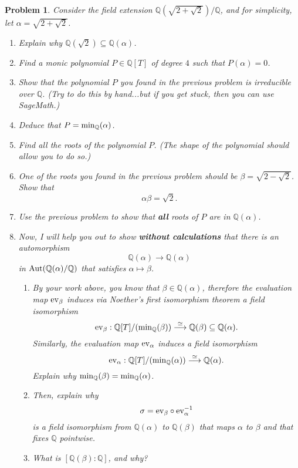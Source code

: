 \documentclass[reqno]{amsart}
\theoremstyle{plain}
\newtheorem{problem}{Problem}
\theoremstyle{definition}
\begin{document}
\begin{problem}
Consider the field extension $\mathbb{Q}(\sqrt{2 + \sqrt{2}})/\mathbb{Q}$, and for simplicity, let $\alpha = \sqrt{2 + \sqrt{2}}$.
\begin{enumerate}
\item Explain why $\mathbb{Q}(\sqrt{2}) \subseteq \mathbb{Q}(\alpha)$.
\item Find a monic polynomial $P \in \mathbb{Q}[T]$ of degree $4$ such that $P(\alpha) = 0$.
\item Show that the polynomial $P$ you found in the previous problem is irreducible over $\mathbb{Q}$.  (Try to do this by hand...but if you get stuck, then you can use SageMath.)
\item Deduce that $P = {\rm min}_{\mathbb{Q}}(\alpha)$.
\item Find all the roots of the polynomial $P$.  (The shape of the polynomial should allow you to do so.)
\item One of the roots you found in the previous problem should be $\beta = \sqrt{2 - \sqrt{2}}$.  Show that
$$\alpha \beta = \sqrt{2}. $$
\item Use the previous problem to show that {\bfseries all} roots of $P$ are in $\mathbb{Q}(\alpha)$.
\item Now, I will help you out to show {\bfseries without calculations} that there is an automorphism 
$$\mathbb{Q}(\alpha) \rightarrow \mathbb{Q}(\alpha)$$
in ${\rm Aut}(\mathbb{Q}(\alpha)/\mathbb{Q})$ that satisfies $\alpha \mapsto \beta$.  
\begin{enumerate}
\item By your work above, you know that $\beta \in \mathbb{Q}(\alpha)$, therefore the evaluation map ${\rm ev}_{\beta}$ induces via Noether's first isomorphism theorem a field isomorphism
$${\rm ev}_{\beta}:\mathbb{Q}[T]/({\rm min}_{\mathbb{Q}}(\beta)) \stackrel{\simeq}{\longrightarrow} \mathbb{Q}(\beta) \subseteq \mathbb{Q}(\alpha). $$
Similarly, the evaluation map ${\rm ev}_{\alpha}$ induces a field isomorphism
$${\rm ev}_{\alpha}:\mathbb{Q}[T]/({\rm min}_{\mathbb{Q}}(\alpha)) \stackrel{\simeq}{\longrightarrow} \mathbb{Q}(\alpha). $$
Explain why ${\rm min}_{\mathbb{Q}}(\beta) = {\rm min}_{\mathbb{Q}}(\alpha)$.  
\item Then, explain why 
$$\sigma = {\rm ev}_{\beta} \circ {\rm ev}_{\alpha}^{-1} $$
is a field isomorphism from $\mathbb{Q}(\alpha)$ to $\mathbb{Q}(\beta)$ that maps $\alpha$ to $\beta$ and that fixes $\mathbb{Q}$ pointwise.
\item What is $[\mathbb{Q}(\beta):\mathbb{Q}]$, and why?

\end{enumerate}
\end{enumerate}
\end{problem}
\end{document}
